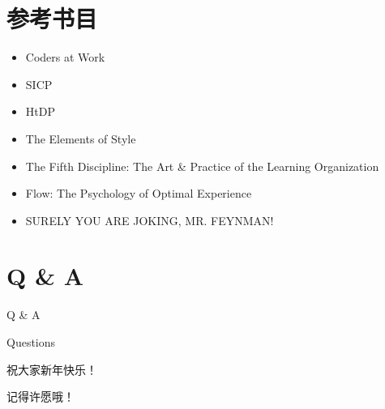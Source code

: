 \documentclass[presentation,dvipdfmx,CJKbookmarks]{beamer}
\begin{document}
\begin{CJK*}{UTF8}{simsun}
\section{参考书目}
\label{sec:orga8c2dca}

\begin{frame}[label={sec:org724efe4}]{}
\begin{itemize}
\item Coders at Work
\item SICP
\item HtDP
\item The Elements of Style
\item The Fifth Discipline: The Art \& Practice of the Learning Organization
\item Flow: The Psychology of Optimal Experience
\item SURELY YOU ARE JOKING, MR. FEYNMAN!
\end{itemize}
\end{frame}
\section{Q \& A}
\label{sec:org6b51010}
\begin{frame}[label={sec:org05ed7d7}]{Q \& A}
\begin{block}{Questions}
\pause
\end{block}
\begin{block}{祝大家新年快乐！}
\pause
\end{block}
\begin{block}{记得许愿哦！}
\end{block}
\end{frame}
\end{CJK*}
\end{document}
